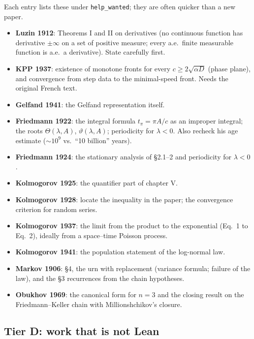 \documentclass[11pt]{article}
\begin{document}
Each entry lists these under \texttt{help\_wanted}; they are often quicker than a new paper.

\begin{itemize}
\item \textbf{Luzin 1912}: Theorems I and II on derivatives (no continuous function has derivative $\pm\infty$ on a set of positive measure; every a.e.\ finite measurable function is a.e.\ a derivative). State carefully first.
\item \textbf{KPP 1937}: existence of monotone fronts for every $c\ge 2\sqrt{\alpha D}$ (phase plane), and convergence from step data to the minimal-speed front. Needs the original French text.
\item \textbf{Gelfand 1941}: the Gelfand representation itself.
\item \textbf{Friedmann 1922}: the integral formula $t_\pi=\pi A/c$ as an improper integral; the roots $\Theta(\lambda,A)$, $\vartheta(\lambda,A)$; periodicity for $\lambda<0$. Also recheck his age estimate ($\sim10^{9}$ vs.\ ``10 billion'' years).
\item \textbf{Friedmann 1924}: the stationary analysis of \S2.1--2 and periodicity for $\lambda<0$.
\item \textbf{Kolmogorov 1925}: the quantifier part of chapter V.
\item \textbf{Kolmogorov 1928}: locate the inequality in the paper; the convergence criterion for random series.
\item \textbf{Kolmogorov 1937}: the limit from the product to the exponential (Eq.\ 1 to Eq.\ 2), ideally from a space--time Poisson process.
\item \textbf{Kolmogorov 1941}: the population statement of the log-normal law.
\item \textbf{Markov 1906}: \S4, the urn with replacement (variance formula; failure of the law), and the \S3 recurrences from the chain hypotheses.
\item \textbf{Obukhov 1969}: the canonical form for $n=3$ and the closing result on the Friedmann--Keller chain with Millionshchikov's closure.
\end{itemize}

\subsection{Tier D: work that is not Lean}
\end{document}
